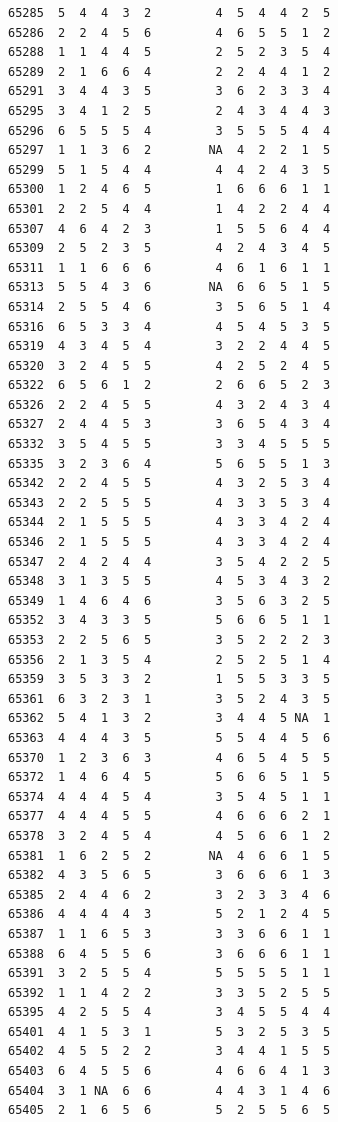 \documentclass[
  letterpaper,
  DIV=11,
  numbers=noendperiod]{scrreprt}
\begin{document}
\begin{verbatim}
65285  5  4  4  3  2         4  5  4  4  2  5
65286  2  2  4  5  6         4  6  5  5  1  2
65288  1  1  4  4  5         2  5  2  3  5  4
65289  2  1  6  6  4         2  2  4  4  1  2
65291  3  4  4  3  5         3  6  2  3  3  4
65295  3  4  1  2  5         2  4  3  4  4  3
65296  6  5  5  5  4         3  5  5  5  4  4
65297  1  1  3  6  2        NA  4  2  2  1  5
65299  5  1  5  4  4         4  4  2  4  3  5
65300  1  2  4  6  5         1  6  6  6  1  1
65301  2  2  5  4  4         1  4  2  2  4  4
65307  4  6  4  2  3         1  5  5  6  4  4
65309  2  5  2  3  5         4  2  4  3  4  5
65311  1  1  6  6  6         4  6  1  6  1  1
65313  5  5  4  3  6        NA  6  6  5  1  5
65314  2  5  5  4  6         3  5  6  5  1  4
65316  6  5  3  3  4         4  5  4  5  3  5
65319  4  3  4  5  4         3  2  2  4  4  5
65320  3  2  4  5  5         4  2  5  2  4  5
65322  6  5  6  1  2         2  6  6  5  2  3
65326  2  2  4  5  5         4  3  2  4  3  4
65327  2  4  4  5  3         3  6  5  4  3  4
65332  3  5  4  5  5         3  3  4  5  5  5
65335  3  2  3  6  4         5  6  5  5  1  3
65342  2  2  4  5  5         4  3  2  5  3  4
65343  2  2  5  5  5         4  3  3  5  3  4
65344  2  1  5  5  5         4  3  3  4  2  4
65346  2  1  5  5  5         4  3  3  4  2  4
65347  2  4  2  4  4         3  5  4  2  2  5
65348  3  1  3  5  5         4  5  3  4  3  2
65349  1  4  6  4  6         3  5  6  3  2  5
65352  3  4  3  3  5         5  6  6  5  1  1
65353  2  2  5  6  5         3  5  2  2  2  3
65356  2  1  3  5  4         2  5  2  5  1  4
65359  3  5  3  3  2         1  5  5  3  3  5
65361  6  3  2  3  1         3  5  2  4  3  5
65362  5  4  1  3  2         3  4  4  5 NA  1
65363  4  4  4  3  5         5  5  4  4  5  6
65370  1  2  3  6  3         4  6  5  4  5  5
65372  1  4  6  4  5         5  6  6  5  1  5
65374  4  4  4  5  4         3  5  4  5  1  1
65377  4  4  4  5  5         4  6  6  6  2  1
65378  3  2  4  5  4         4  5  6  6  1  2
65381  1  6  2  5  2        NA  4  6  6  1  5
65382  4  3  5  6  5         3  6  6  6  1  3
65385  2  4  4  6  2         3  2  3  3  4  6
65386  4  4  4  4  3         5  2  1  2  4  5
65387  1  1  6  5  3         3  3  6  6  1  1
65388  6  4  5  5  6         3  6  6  6  1  1
65391  3  2  5  5  4         5  5  5  5  1  1
65392  1  1  4  2  2         3  3  5  2  5  5
65395  4  2  5  5  4         3  4  5  5  4  4
65401  4  1  5  3  1         5  3  2  5  3  5
65402  4  5  5  2  2         3  4  4  1  5  5
65403  6  4  5  5  6         4  6  6  4  1  3
65404  3  1 NA  6  6         4  4  3  1  4  6
65405  2  1  6  5  6         5  2  5  5  6  5

\end{verbatim}
\end{document}
